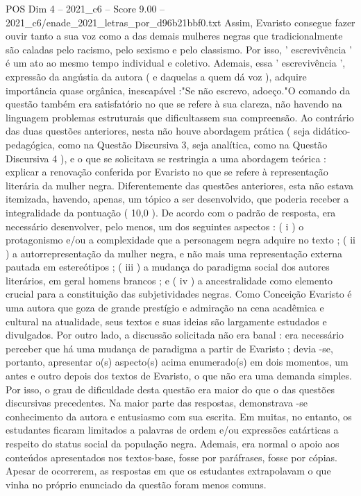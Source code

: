 \begin{textsample}{POS Dim 4 – 2021\_c6 – Score 9.00 – 2021\_c6/enade\_2021\_letras\_por\_d96b21bbf0.txt}
Assim, Evaristo consegue fazer ouvir tanto a sua voz como a das demais mulheres negras que tradicionalmente são caladas pelo racismo, pelo sexismo e pelo classismo.
Por isso, ' escrevivência ' é um ato ao mesmo tempo individual e coletivo.
Ademais, essa ' escrevivência ', expressão da angústia da autora ( e daquelas a quem dá voz ), adquire importância quase orgânica, inescapável :"Se não escrevo, adoeço."O comando da questão também era satisfatório no que se refere à sua clareza, não havendo na linguagem problemas estruturais que dificultassem sua compreensão.
Ao contrário das duas questões anteriores, nesta não houve abordagem prática ( seja didático-pedagógica, como na Questão Discursiva 3, seja analítica, como na Questão Discursiva 4 ), e o que se solicitava se restringia a uma abordagem teórica : explicar a renovação conferida por Evaristo no que se refere à representação literária da mulher negra.
Diferentemente das questões anteriores, esta não estava itemizada, havendo, apenas, um tópico a ser desenvolvido, que poderia receber a integralidade da pontuação ( 10,0 ).
De acordo com o padrão de resposta, era necessário desenvolver, pelo menos, um dos seguintes aspectos : ( i ) o protagonismo e/ou a complexidade que a personagem negra adquire no texto ; ( ii ) a autorrepresentação da mulher negra, e não mais uma representação externa pautada em estereótipos ; ( iii ) a mudança do paradigma social dos autores literários, em geral homens brancos ; e ( iv ) a ancestralidade como elemento crucial para a constituição das subjetividades negras.
Como Conceição Evaristo é uma autora que goza de grande prestígio e admiração na cena acadêmica e cultural na atualidade, seus textos e suas ideias são largamente estudados e divulgados.
Por outro lado, a discussão solicitada não era banal : era necessário perceber que há uma mudança de paradigma a partir de Evaristo ; devia -se, portanto, apresentar o(s) aspecto(s) acima enumerado(s) em dois momentos, um antes e outro depois dos textos de Evaristo, o que não era uma demanda simples.
Por isso, o grau de dificuldade desta questão era maior do que o das questões discursivas precedentes.
Na maior parte das respostas, demonstrava -se conhecimento da autora e entusiasmo com sua escrita.
Em muitas, no entanto, os estudantes ficaram limitados a palavras de ordem e/ou expressões catárticas a respeito do status social da população negra.
Ademais, era normal o apoio aos conteúdos apresentados nos textos-base, fosse por paráfrases, fosse por cópias.
Apesar de ocorrerem, as respostas em que os estudantes extrapolavam o que vinha no próprio enunciado da questão foram menos comuns.

\end{textsample}

